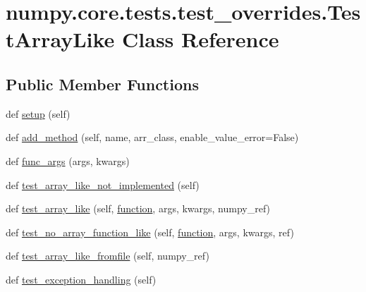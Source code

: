 \hypertarget{classnumpy_1_1core_1_1tests_1_1test__overrides_1_1TestArrayLike}{}\section{numpy.\+core.\+tests.\+test\+\_\+overrides.\+Test\+Array\+Like Class Reference}
\label{classnumpy_1_1core_1_1tests_1_1test__overrides_1_1TestArrayLike}
\subsection*{Public Member Functions}
\begin{DoxyCompactItemize}
\item 
def \hyperlink{classnumpy_1_1core_1_1tests_1_1test__overrides_1_1TestArrayLike_a8e9c4582b07d3d313dd9c3982c7105fe}{setup} (self)
\item 
def \hyperlink{classnumpy_1_1core_1_1tests_1_1test__overrides_1_1TestArrayLike_a625d68535f2fa5ea497eebe69c4814a6}{add\+\_\+method} (self, name, arr\+\_\+class, enable\+\_\+value\+\_\+error=False)
\item 
def \hyperlink{classnumpy_1_1core_1_1tests_1_1test__overrides_1_1TestArrayLike_aafba6d63c640c5bc9d4cbf07262405e3}{func\+\_\+args} (args, kwargs)
\item 
def \hyperlink{classnumpy_1_1core_1_1tests_1_1test__overrides_1_1TestArrayLike_ab57d65d2e106d8f26ca6d7425957cc7d}{test\+\_\+array\+\_\+like\+\_\+not\+\_\+implemented} (self)
\item 
def \hyperlink{classnumpy_1_1core_1_1tests_1_1test__overrides_1_1TestArrayLike_aa58c8a7561bed6ed0f1dc11cfd14fa0b}{test\+\_\+array\+\_\+like} (self, \hyperlink{classnumpy_1_1core_1_1tests_1_1test__overrides_1_1TestArrayLike_aeaa55556625b6a898fd1d11df1c26f54}{function}, args, kwargs, numpy\+\_\+ref)
\item 
def \hyperlink{classnumpy_1_1core_1_1tests_1_1test__overrides_1_1TestArrayLike_a0bd40d4909bb2de9b890b92c803a5ed7}{test\+\_\+no\+\_\+array\+\_\+function\+\_\+like} (self, \hyperlink{classnumpy_1_1core_1_1tests_1_1test__overrides_1_1TestArrayLike_aeaa55556625b6a898fd1d11df1c26f54}{function}, args, kwargs, ref)
\item 
def \hyperlink{classnumpy_1_1core_1_1tests_1_1test__overrides_1_1TestArrayLike_a3722926ed265793009e74e286c1c43f2}{test\+\_\+array\+\_\+like\+\_\+fromfile} (self, numpy\+\_\+ref)
\item 
def \hyperlink{classnumpy_1_1core_1_1tests_1_1test__overrides_1_1TestArrayLike_a1c28faa1e76231f4aeb57221d07deb6b}{test\+\_\+exception\+\_\+handling} (self)
\end{DoxyCompactItemize}
